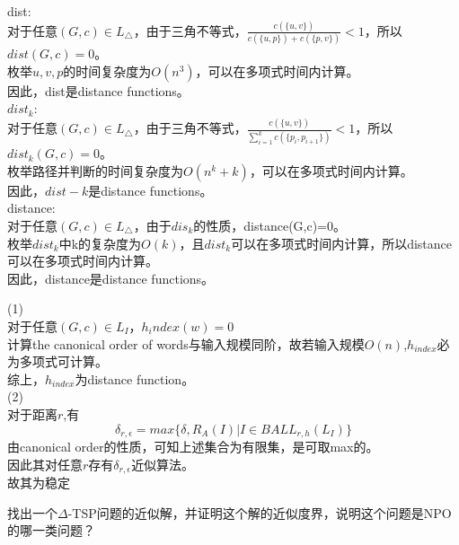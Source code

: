 \documentclass[a4paper, justified]{tufte-handout}
\begin{document}
\begin{solution}
  dist: \\
  对于任意$(G,c)\in L_{\triangle}$，由于三角不等式，$\frac{c(\{u,v\})}{c(\{u,p\})+ {c(\{p,v\})}}<1$，所以$dist(G,c)=0$。\\
  枚举$u,v,p$的时间复杂度为$O(n^3)$，可以在多项式时间内计算。\\
  因此，dist是distance functions。\\
  $dist_{k}$: \\
  对于任意$(G,c)\in L_{\triangle}$，由于三角不等式，$\frac{c(\{u,v\})}{\sum_{i=1}^kc(\{p_i, p_{i+1}\})}<1$，所以$dist_k(G,c)=0$。\\
  枚举路径并判断的时间复杂度为$O(n^k+k)$，可以在多项式时间内计算。\\
  因此，$dist-k$是distance functions。\\
  distance: \\
  对于任意$(G,c)\in L_{\triangle}$，由于$dis_k$的性质，distance(G,c)=0。\\
  枚举$dist_k$中k的复杂度为$O(k)$，且$dist_k$可以在多项式时间内计算，所以distance可以在多项式时间内计算。\\
  因此，distance是distance functions。
\end{solution}

\begin{problem}[JH 4.2.3.4]
\end{problem}

\begin{solution}
  (1)\\
  对于任意$(G,c)\in L_{I}$，$h_index(w)=0$\\
  计算the canonical order of words与输入规模同阶，故若输入规模$O(n)$,$h_{index}$必为多项式可计算。\\
  综上，$h_{index}$为distance function。\\
  (2)\\
  对于距离$r$,有
  \[
    \delta_{r,\epsilon}=max\{\delta, R_{A}(I)| I \in BALL_{r,h}(L_I)\}
  \]
  由canonical order的性质，可知上述集合为有限集，是可取max的。\\
  因此其对任意$r$存有$\delta_{r,\epsilon}$近似算法。\\
  故其为稳定
\end{solution}

\beginoptional


\beginot
\begin{ot}
  找出一个$\Delta$-TSP问题的近似解，并证明这个解的近似度界，说明这个问题是NPO的哪一类问题？
\end{ot}
\end{document}
